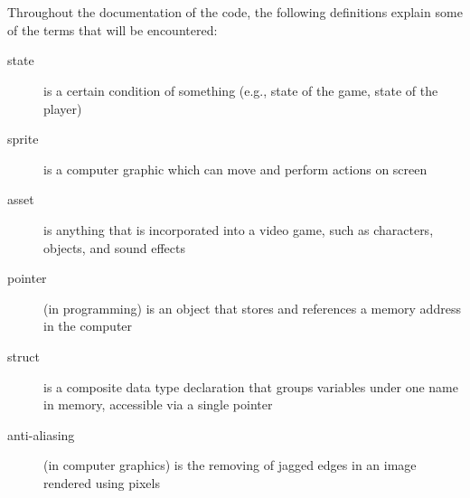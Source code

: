 \\
\\
Throughout the documentation of the code, the following definitions explain
some of the terms that will be encountered:

\begin{description}
    \item[state]{is a certain condition of something (e.g., state of the game, state of the player)}
    \item[sprite]{is a computer graphic which can move and perform actions on screen}
    \item[asset]{is anything that is incorporated into a video game, such as characters, objects, and sound effects}
    \item[pointer]{(in programming) is an object that stores and references a memory address in the computer}
    \item[struct]{is a composite data type declaration that groups variables under one name in memory, accessible via a single pointer} 
    \item[anti-aliasing]{(in computer graphics) is the removing of jagged edges in an image rendered using pixels}
\end{description}
